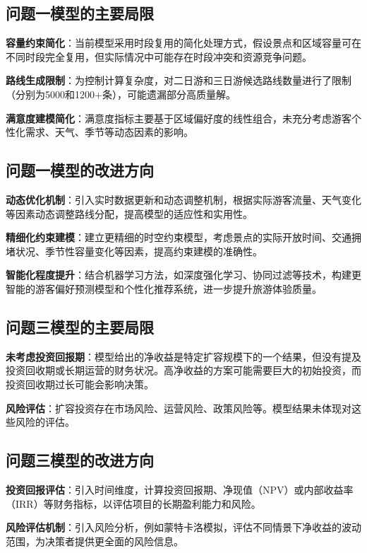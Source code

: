 \subsection[\hspace{-2pt}问题一模型的主要局限]{{\heiti{} \hspace{-8pt}问题一模型的主要局限}}\label{subsection5: 问题一模型局限}

\noindent\textbf{容量约束简化}：当前模型采用时段复用的简化处理方式，假设景点和区域容量可在不同时段完全复用，但实际情况中可能存在时段冲突和资源竞争问题。

\noindent\textbf{路线生成限制}：为控制计算复杂度，对二日游和三日游候选路线数量进行了限制（分别为5000和1200+条），可能遗漏部分高质量解。

\noindent\textbf{满意度建模简化}：满意度指标主要基于区域偏好度的线性组合，未充分考虑游客个性化需求、天气、季节等动态因素的影响。

\subsection[\hspace{-2pt}问题一模型的改进方向]{{\heiti{} \hspace{-8pt}问题一模型的改进方向}}\label{subsection5: 问题一模型改进}

\noindent\textbf{动态优化机制}：引入实时数据更新和动态调整机制，根据实际游客流量、天气变化等因素动态调整路线分配，提高模型的适应性和实用性。

\noindent\textbf{精细化约束建模}：建立更精细的时空约束模型，考虑景点的实际开放时间、交通拥堵状况、季节性容量变化等因素，提高约束建模的准确性。

\noindent\textbf{智能化程度提升}：结合机器学习方法，如深度强化学习、协同过滤等技术，构建更智能的游客偏好预测模型和个性化推荐系统，进一步提升旅游体验质量。

\subsection[\hspace{-2pt}问题三模型的主要局限]{{\heiti{} \hspace{-8pt}问题三模型的主要局限}}\label{subsection5: 问题三模型局限}


\noindent\textbf{未考虑投资回报期}：模型给出的净收益是特定扩容规模下的一个结果，但没有提及投资回收期或长期运营的财务状况。高净收益的方案可能需要巨大的初始投资，而投资回收期过长可能会影响决策。

\noindent\textbf{风险评估}：扩容投资存在市场风险、运营风险、政策风险等。模型结果未体现对这些风险的评估。

\subsection[\hspace{-2pt}问题三模型的改进方向]{{\heiti{} \hspace{-8pt}问题三模型的改进方向}}\label{subsection5: 问题三模型改进}


\noindent\textbf{投资回报评估}：引入时间维度，计算投资回报期、净现值（NPV）或内部收益率（IRR）等财务指标，以评估项目的长期盈利能力和风险。

\noindent\textbf{风险评估机制}：引入风险分析，例如蒙特卡洛模拟，评估不同情景下净收益的波动范围，为决策者提供更全面的风险信息。